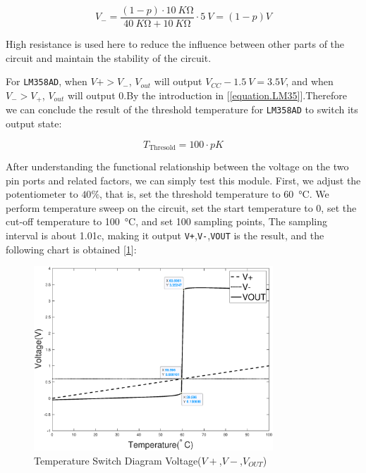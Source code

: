 \documentclass[12pt]{article}
\numberwithin{equation}{section}
\begin{document}
\begin{equation}
	V_-=\frac{(1-p) \cdot \qty{10}{K \ohm}}{\qty{40}{K \ohm}+\qty{10}{K \ohm}} \cdot \qty{5}{V}=(1-p)\unit{V}
\end{equation}

 
High resistance is used here to reduce the influence between other parts of the circuit and maintain the stability of the circuit.

For \verb|LM358AD|, when $V + > V_-$, $V_{out} $ will output $V_{CC} - \qty{1.5}{V}=3.5V $, and when $V_- > V_+$, $V_ {out}$ will output $0$.By the introduction in [\ref{equation.LM35}].Therefore we can conclude the result of the threshold temperature for \verb|LM358AD| to switch its output state:

\begin{equation}
	T_{\text{Thresold}}=100 \cdot p \unit{K}
\end{equation} 



After understanding the functional relationship between the voltage on the two pin ports and related factors, we can simply test this module. First, we adjust the potentiometer to $40\%$, that is, set the threshold temperature to \qty{60}{\degreeCelsius}. We perform temperature sweep on the circuit, set the start temperature to 0, set the cut-off temperature to \qty{100}{\degreeCelsius}, and set \num{100} sampling points, The sampling interval is about 1.01c, making it output \verb|V+|,\verb|V-|,\verb|VOUT| is the result, and the following chart is obtained [\ref{Fig.temp_switch_diagram}]:

\begin{figure}[H] %
\centering %
\includegraphics[width=0.8\textwidth]{temperature_switch_diagram} %
\caption{Temperature Switch Diagram Voltage($V+$,$V-$,$V_{OUT}$)} %
\label{Fig.temp_switch_diagram} %
\end{figure}
\end{document}
